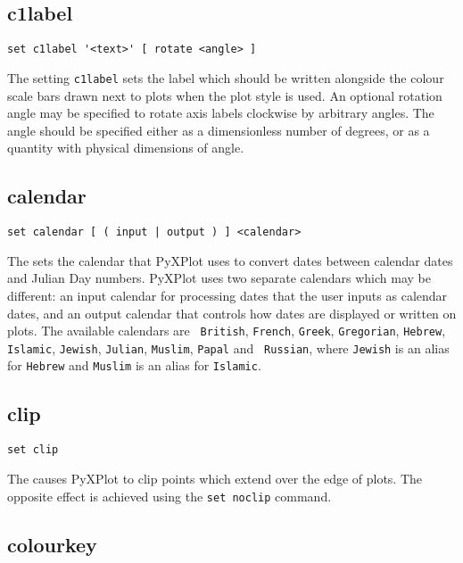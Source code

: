 \subsection{c1label}

\begin{verbatim}
set c1label '<text>' [ rotate <angle> ]
\end{verbatim}

The setting {\tt c1label} sets the label which should be written alongside the
colour scale bars drawn next to plots when the  plot style
is used. An optional rotation angle may be specified to rotate axis labels
clockwise by arbitrary angles. The angle should be specified either as a
dimensionless number of degrees, or as a quantity with physical dimensions of
angle.


\subsection{calendar}

\begin{verbatim}
set calendar [ ( input | output ) ] <calendar>
\end{verbatim}

The  sets the calendar that PyXPlot uses to convert dates
between calendar dates and Julian Day numbers. PyXPlot uses two separate
calendars which may be different: an input calendar for processing dates that
the user inputs as calendar dates, and an output calendar that controls how
dates are displayed or written on plots.  The available calendars are {\tt
British}, {\tt French}, {\tt Greek}, {\tt Gregorian}, {\tt Hebrew}, {\tt
Islamic}, {\tt Jewish}, {\tt Julian}, {\tt Muslim}, {\tt Papal} and {\tt
Russian}, where {\tt Jewish} is an alias for {\tt Hebrew} and {\tt Muslim} is
an alias for {\tt Islamic}.


\subsection{clip}

\begin{verbatim}
set clip
\end{verbatim}

The  causes PyXPlot to clip points which extend over the edge
of plots. The opposite effect is achieved using the {\tt set noclip}
command.


\subsection{colourkey}

